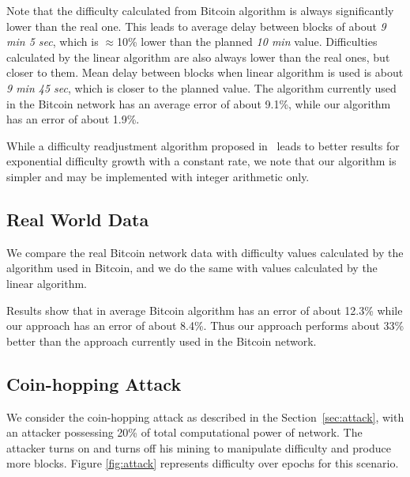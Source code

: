 \documentclass[]{llncs}
\newcommand{\attackname}{coin-hopping attack}
\newcommand{\AttackName}{Coin-hopping Attack}
\begin{document}
Note that the difficulty calculated from Bitcoin algorithm is always significantly lower than the real one.
This leads to average delay between blocks of about {\em 9 min 5 sec}, which is $\approx$10\% lower than the planned {\em 10 min} value.
Difficulties calculated by the linear algorithm are also always lower than the real ones, but closer to them.
Mean delay between blocks when linear algorithm is used is about {\em 9 min 45 sec}, which is closer to the planned value. The algorithm currently used in the Bitcoin network has an average error of about 9.1\%, while our algorithm has an error of about 1.9\%.

While a difficulty readjustment algorithm proposed in~\cite{kraft2015difficulty} leads to better results for exponential difficulty growth with a constant rate, we note that our algorithm is simpler and may be implemented with integer arithmetic only.

\subsection{Real World Data}

We compare the real Bitcoin network data with difficulty values calculated by the algorithm used in Bitcoin, and we do the same with values calculated by the linear algorithm. %


Results show that in average Bitcoin algorithm has an error of about 12.3\% while our approach has an error of about 8.4\%. Thus our approach performs about 33\% better than the approach currently used in the Bitcoin network.

\subsection{\AttackName}

We consider the \attackname{} as described in the Section~\ref{sec:attack}, with an attacker possessing 20\% of total computational power of network. The attacker turns on and turns off his mining to manipulate difficulty and produce more blocks.
Figure \ref{fig:attack} represents difficulty over epochs for this scenario.
\end{document}
